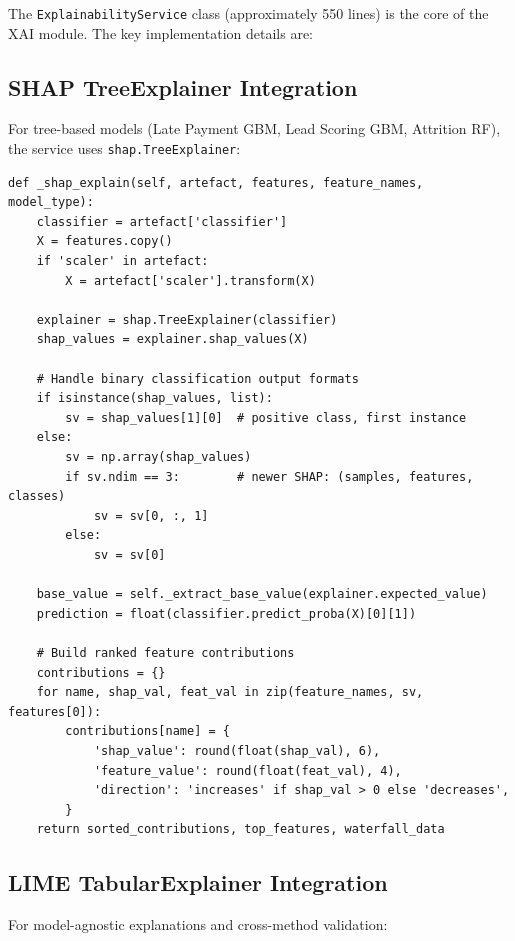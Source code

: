 \documentclass[12pt,a4paper]{report}
\begin{document}
The \texttt{ExplainabilityService} class (approximately 550 lines) is the core of the XAI module. The key implementation details are:

\subsection{SHAP TreeExplainer Integration}

For tree-based models (Late Payment GBM, Lead Scoring GBM, Attrition RF), the service uses \texttt{shap.TreeExplainer}:

\begin{lstlisting}[caption={SHAP instance explanation (simplified)},label={lst:shap_explain}]
def _shap_explain(self, artefact, features, feature_names, model_type):
    classifier = artefact['classifier']
    X = features.copy()
    if 'scaler' in artefact:
        X = artefact['scaler'].transform(X)

    explainer = shap.TreeExplainer(classifier)
    shap_values = explainer.shap_values(X)

    # Handle binary classification output formats
    if isinstance(shap_values, list):
        sv = shap_values[1][0]  # positive class, first instance
    else:
        sv = np.array(shap_values)
        if sv.ndim == 3:        # newer SHAP: (samples, features, classes)
            sv = sv[0, :, 1]
        else:
            sv = sv[0]

    base_value = self._extract_base_value(explainer.expected_value)
    prediction = float(classifier.predict_proba(X)[0][1])

    # Build ranked feature contributions
    contributions = {}
    for name, shap_val, feat_val in zip(feature_names, sv, features[0]):
        contributions[name] = {
            'shap_value': round(float(shap_val), 6),
            'feature_value': round(float(feat_val), 4),
            'direction': 'increases' if shap_val > 0 else 'decreases',
        }
    return sorted_contributions, top_features, waterfall_data
\end{lstlisting}

\subsection{LIME TabularExplainer Integration}

For model-agnostic explanations and cross-method validation:
\end{document}
